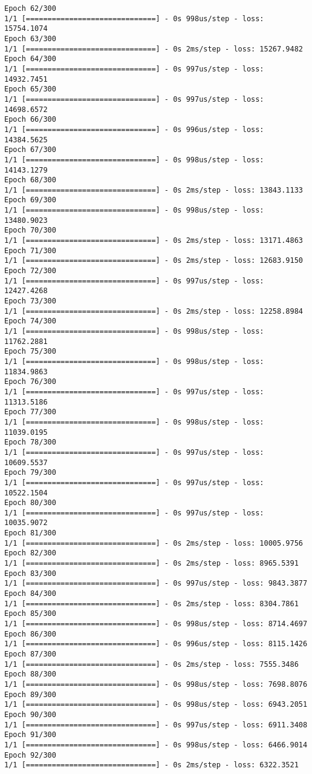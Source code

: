 \documentclass[11pt]{article}
\begin{document}
\begin{Verbatim}[commandchars=\\\{\}]
Epoch 62/300
1/1 [==============================] - 0s 998us/step - loss: 15754.1074
Epoch 63/300
1/1 [==============================] - 0s 2ms/step - loss: 15267.9482
Epoch 64/300
1/1 [==============================] - 0s 997us/step - loss: 14932.7451
Epoch 65/300
1/1 [==============================] - 0s 997us/step - loss: 14698.6572
Epoch 66/300
1/1 [==============================] - 0s 996us/step - loss: 14384.5625
Epoch 67/300
1/1 [==============================] - 0s 998us/step - loss: 14143.1279
Epoch 68/300
1/1 [==============================] - 0s 2ms/step - loss: 13843.1133
Epoch 69/300
1/1 [==============================] - 0s 998us/step - loss: 13480.9023
Epoch 70/300
1/1 [==============================] - 0s 2ms/step - loss: 13171.4863
Epoch 71/300
1/1 [==============================] - 0s 2ms/step - loss: 12683.9150
Epoch 72/300
1/1 [==============================] - 0s 997us/step - loss: 12427.4268
Epoch 73/300
1/1 [==============================] - 0s 2ms/step - loss: 12258.8984
Epoch 74/300
1/1 [==============================] - 0s 998us/step - loss: 11762.2881
Epoch 75/300
1/1 [==============================] - 0s 998us/step - loss: 11834.9863
Epoch 76/300
1/1 [==============================] - 0s 997us/step - loss: 11313.5186
Epoch 77/300
1/1 [==============================] - 0s 998us/step - loss: 11039.0195
Epoch 78/300
1/1 [==============================] - 0s 997us/step - loss: 10609.5537
Epoch 79/300
1/1 [==============================] - 0s 997us/step - loss: 10522.1504
Epoch 80/300
1/1 [==============================] - 0s 997us/step - loss: 10035.9072
Epoch 81/300
1/1 [==============================] - 0s 2ms/step - loss: 10005.9756
Epoch 82/300
1/1 [==============================] - 0s 2ms/step - loss: 8965.5391
Epoch 83/300
1/1 [==============================] - 0s 997us/step - loss: 9843.3877
Epoch 84/300
1/1 [==============================] - 0s 2ms/step - loss: 8304.7861
Epoch 85/300
1/1 [==============================] - 0s 998us/step - loss: 8714.4697
Epoch 86/300
1/1 [==============================] - 0s 996us/step - loss: 8115.1426
Epoch 87/300
1/1 [==============================] - 0s 2ms/step - loss: 7555.3486
Epoch 88/300
1/1 [==============================] - 0s 998us/step - loss: 7698.8076
Epoch 89/300
1/1 [==============================] - 0s 998us/step - loss: 6943.2051
Epoch 90/300
1/1 [==============================] - 0s 997us/step - loss: 6911.3408
Epoch 91/300
1/1 [==============================] - 0s 998us/step - loss: 6466.9014
Epoch 92/300
1/1 [==============================] - 0s 2ms/step - loss: 6322.3521

\end{Verbatim}
\end{document}
